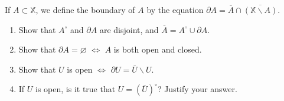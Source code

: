 \documentclass[a4paper,12pt, reqno]{article}
\theoremstyle{definition}
\newenvironment{exerr}[1]{
  \renewcommand\theexeralt{#1}
  \exeralt
}{\endexeralt}
\newcommand{\X}{\mathbb{X}}
\begin{document}
\begin{exerr}{19}
  If $A\subset\X$, we define the boundary of $A$ by the equation $\partial A = \overline{A}\cap\overline{(\X\backslash A)}$.
  \begin{enumerate}[label=(\alph*)]
    \item Show that $A^\circ$ and $\partial A$ are disjoint, and $\overline{A} = A^\circ\cup\partial A$.
    \item Show that $\partial A = \varnothing$ $\Longleftrightarrow$ $A$ is both open and closed.
    \item Show that $U$ is open $\Longleftrightarrow$ $\partial U = \overline{U}\backslash U$.
    \item If $U$ is open, is it true that $U = (\overline{U})^\circ$? Justify your answer.
  \end{enumerate}
\end{exerr}
\end{document}
